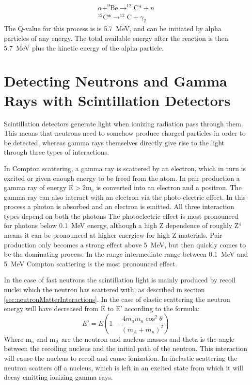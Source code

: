 \documentclass[main.tex]{subfiles}
\begin{document}
\begin{equation}
	\begin{split}
		\alpha+^\text{9}\text{Be}\rightarrow^\text{12}\text{C*}+n\\
		^\text{12}\text{C*}\rightarrow^\text{12}\text{C} + \gamma_2
	\label{eq:alphaBe}
	\end{split}
\end{equation}
The Q-value for this process is is \SI{5.7}{MeV}, and can be initiated by alpha particles of any energy. The total available energy after the reaction is then \SI{5.7}{MeV} plus the kinetic energy of the alpha particle.

\section{Detecting Neutrons and Gamma Rays with Scintillation Detectors}
Scintillation detectors generate light when ionizing radiation pass through them. This means that neutrons need to somehow produce charged particles in order to be detected, whereas gamma rays themselves directly give rise to the light through three types of interactions.

In Compton scattering, a gamma ray is scattered by an electron, which in turn is excited or given enough energy to be freed from the atom. In pair production a gamma ray of energy E$>$2m$_\text{e}$ is converted into an electron and a positron. The gamma ray can also interact with an electron via the photo-electric effect. In this process a photon is absorbed and an electron is emitted. All three interaction types depend on both the photons
The photoelectric effect is most pronounced for photons below \SI{0.1}{\MeV} energy, although a high Z dependence of roughly Z$^\text{4}$ means it can be pronounced at higher energiew for high Z materials. Pair production only becomes a strong effect above \SI{5}{\MeV}, but then quickly comes to be the dominating process. In the range intermediate range between \SI{0.1}{\MeV} and \SI{5}{\MeV} Compton scattering is the most pronounced effect.

In the case of fast neutrons the scintillation light is mainly produced by recoil nuclei which the neutron has scattered with, as described in section \ref{sec:neutronMatterInteractions}. In the case of elastic scattering the neutron energy will have decreased from E to E' according to the formula\cite[pg. 219]{Tavernier}:
\begin{equation}
	E' = E\left(1 - \frac{4m_a m_n \cos^2{\theta}}{\left(m_A + m_n\right)^2}\right)
	\label{eq:scat}
\end{equation}
Where m$_\text{n}$ and m$_\text{A}$ are the neutron and nucleus masses and theta is the angle between the recoiling nucleus and the initial path of the neutron. This interaction will cause the nucleus to recoil and cause ionization. In inelastic scattering the neutron scatters off a nucleus, which is left in an excited state from which it will decay emitting ionizing gamma rays.
\end{document}
